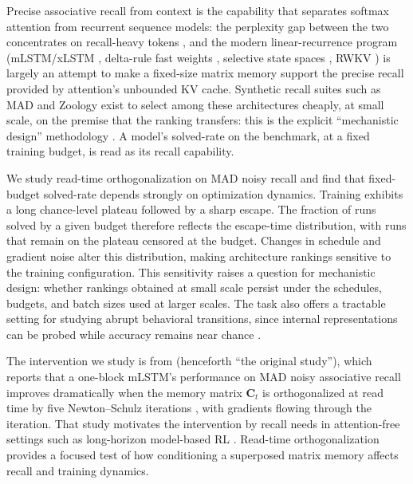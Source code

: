 \documentclass[11pt]{article}
\newcommand{\C}{\mathbf{C}}
\begin{document}
Precise associative recall from context is the capability that separates softmax
attention from recurrent sequence models: the perplexity gap between the two
concentrates on recall-heavy tokens \citep{arora2023zoology,arora2024based}, and
the modern linear-recurrence program (mLSTM/xLSTM \citep{beck2024xlstm}, delta-rule
fast weights \citep{schlag2021linear,yang2024deltanet}, selective state spaces
\citep{gu2023mamba}, RWKV \citep{peng2023rwkv}) is largely an attempt to make a
fixed-size matrix memory support the precise recall provided by attention's
unbounded KV cache. Synthetic recall suites such as MAD \citep{poli2024mad}
and Zoology \citep{arora2023zoology} exist to select among these
architectures cheaply, at small scale, on the premise that the ranking transfers:
this is the explicit ``mechanistic design'' methodology \citep{poli2024mad}. A
model's solved-rate on the benchmark, at a fixed training budget, is read as its
recall capability.

We study read-time orthogonalization on MAD noisy recall and find that
fixed-budget solved-rate depends strongly on optimization dynamics. Training
exhibits a long chance-level plateau followed by a sharp escape. The fraction of
runs solved by a given budget therefore reflects the escape-time distribution,
with runs that remain on the plateau censored at the budget. Changes in schedule
and gradient noise alter this distribution, making architecture rankings
sensitive to the training configuration. This sensitivity raises a question for
mechanistic design: whether rankings obtained at small scale persist under the
schedules, budgets, and batch sizes used at larger scales. The task also offers a
tractable setting for studying abrupt behavioral transitions, since internal
representations can be probed while accuracy remains near chance
\citep{wei2022emergent,schaeffer2023mirage}.

The intervention we study is from \citet{tambde2026ortho} (henceforth ``the
original study''), which reports that a one-block mLSTM's performance on MAD noisy
associative recall improves dramatically when the memory matrix $\C_t$ is
orthogonalized at read time by five Newton--Schulz iterations
\citep{bjorck1971iterative,higham2008functions}, with gradients flowing through the
iteration. That study motivates the intervention by recall needs in attention-free settings
such as long-horizon model-based RL \citep{hafner2020dreamer}. Read-time
orthogonalization provides a focused test of how conditioning a superposed
matrix memory affects recall and training dynamics.
\end{document}
